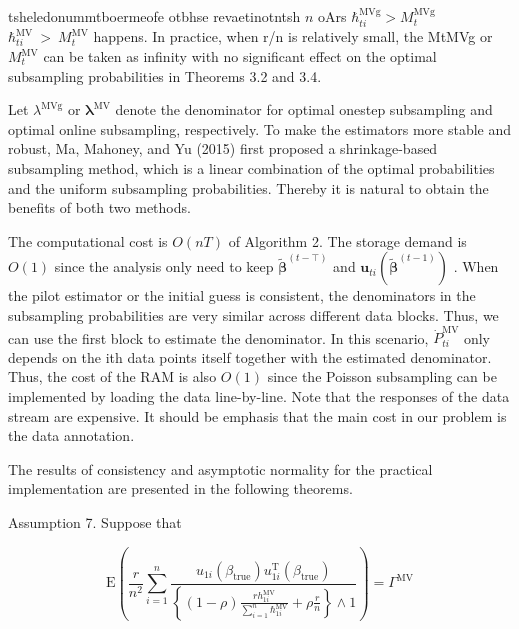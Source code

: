 \documentclass[
  10
]{article}
\begin{document}
tsheledonummtboermeofe otbhse revaetinotntsh \(n\) oArs
\(\hbar _ { t i } ^ { \mathrm { M V g } } > M _ { t } ^ { \mathrm { M V g } }\)
\(\hbar _ { t i } ^ { \mathrm { M V } } ~ > ~ M _ { t } ^ { \mathrm { M V } }\)
happens. In practice, when r/n is relatively small, the MtMVg or
\(M _ { t } ^ { \mathrm { M V } }\) can be taken as infinity with no
significant effect on the optimal subsampling probabilities in Theorems
3.2 and 3.4.

Let \({ \lambda } ^ { \mathrm { M V g } }\) or
\({ \boldsymbol { \lambda } } ^ { \mathrm { M V } }\) denote the
denominator for optimal onestep subsampling and optimal online
subsampling, respectively. To make the estimators more stable and
robust, Ma, Mahoney, and Yu (2015) first proposed a shrinkage-based
subsampling method, which is a linear combination of the optimal
probabilities and the uniform subsampling probabilities. Thereby it is
natural to obtain the benefits of both two methods.

The computational cost is \(O ( n T )\) of Algorithm 2. The storage
demand is \(O ( 1 )\) since the analysis only need to keep
\(\tilde { \pmb { \beta } } ^ { ( t - \top ) }\) and
\({ \pmb u } _ { t i } ( { \tilde { \pmb \beta } } ^ { ( t - 1 ) } )\) .
When the pilot estimator or the initial guess is consistent, the
denominators in the subsampling probabilities are very similar across
different data blocks. Thus, we can use the first block to estimate the
denominator. In this scenario,
\(\dot { P } _ { t i } ^ { \mathrm { M V } }\) only depends on the ith
data points itself together with the estimated denominator. Thus, the
cost of the RAM is also \(O ( 1 )\) since the Poisson subsampling can be
implemented by loading the data line-by-line. Note that the responses of
the data stream are expensive. It should be emphasis that the main cost
in our problem is the data annotation.

The results of consistency and asymptotic normality for the practical
implementation are presented in the following theorems.

Assumption 7. Suppose that

\[
\mathrm { E } \left( \frac { r } { n ^ { 2 } } \sum _ { i = 1 } ^ { n } \frac { u _ { \mathrm { 1 } i } ( \beta _ { \mathrm { t r u e } } ) u _ { \mathrm { 1 } i } ^ { \mathrm { { T } } } ( \beta _ { \mathrm { t r u e } } ) } { \left\{ ( 1 - \rho ) \frac { r h _ { \mathrm { 1 } i } ^ { \mathrm { { M V } } } } { \sum _ { i = 1 } ^ { n } \hbar _ { \mathrm { 1 } i } ^ { \mathrm { { M V } } } } + \rho \frac { r } { n } \right\} \wedge 1 } \right) = \Gamma ^ { \mathrm { M V } }
\]
\end{document}
